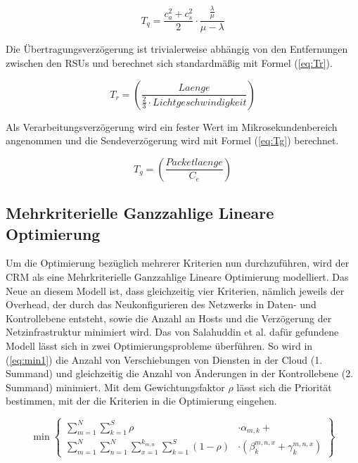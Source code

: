 \documentclass[conference]{IEEEtran}
\begin{document}
\begin{equation}
T_q=\frac{c_a^2+c_s^2}{2}\cdot \frac{\frac{\lambda}{\mu}}{\mu-\lambda}
\label{eq:Tq}
\end{equation}

Die Übertragungsverzögerung ist trivialerweise abhängig von den Entfernungen zwischen den RSUs und berechnet sich standardmäßig mit Formel (\ref{eq:Tr}).

\begin{equation}
T_r=\left(\frac{Laenge}{\frac{2}{3}\cdot Lichtgeschwindigkeit}\right)
\label{eq:Tr}
\end{equation}

Als Verarbeitungsverzögerung wird ein fester Wert im Mikrosekundenbereich angenommen und die Sendeverzögerung wird mit Formel (\ref{eq:Tg}) berechnet.

\begin{equation}
T_g=\left(\frac{Packetlaenge}{C_e}\right)
\label{eq:Tg}
\end{equation}


\subsection{Mehrkriterielle Ganzzahlige Lineare Optimierung}

Um die Optimierung bezüglich mehrerer Kriterien nun durchzuführen, wird der CRM als eine Mehrkriterielle Ganzzahlige Lineare Optimierung modelliert. Das Neue an diesem Modell ist, dass gleichzeitig vier Kriterien, nämlich jeweils der Overhead, der durch das Neukonfigurieren des Netzwerks in Daten- und Kontrollebene entsteht, sowie die Anzahl an Hosts und die Verzögerung der Netzinfrastruktur minimiert wird. Das von Salahuddin et al. dafür gefundene Modell lässt sich in zwei Optimierungsprobleme überführen.
So wird in (\ref{eq:min1}) die Anzahl von Verschiebungen von Diensten in der Cloud (1. Summand) und gleichzeitig die Anzahl von Änderungen in der Kontrollebene (2. Summand) minimiert. Mit dem Gewichtungsfaktor \(\rho\) lässt sich die Priorität bestimmen, mit der die Kriterien in die Optimierung eingehen. 

\begin{equation}
     \min\left\{\begin{split} \sum\limits_{m=1}^N \sum\limits_{k=1}^S \rho &\cdot\alpha_{m,k} + \\
         \sum\limits_{m=1}^N \sum\limits_{n=1}^N \sum\limits_{x=1}^{k_{m,n}}
\sum\limits_{k=1}^S (1-\rho)&\cdot(\beta_{k}^{m,n,x}+ \gamma_{k}^{m,n,x})\end{split}\right\}
\label{eq:min1}
\end{equation}
\end{document}
